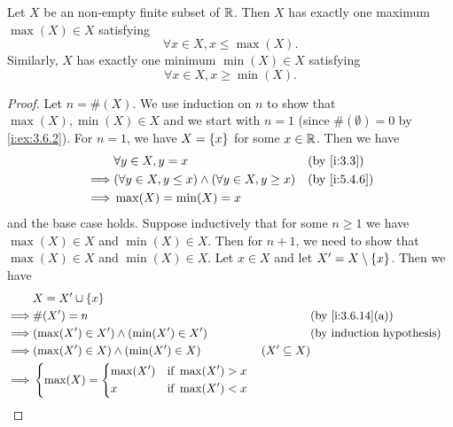 \begin{ac}\label{i:ac:5.4.1}
  Let \(X\) be an non-empty finite subset of \(\mathbb{R}\).
  Then \(X\) has exactly one maximum \(\max(X) \in X\) satisfying
  \[
    \forall x \in X, x \leq \max(X).
  \]
  Similarly, \(X\) has exactly one minimum \(\min(X) \in X\) satisfying
  \[
    \forall x \in X, x \geq \min(X).
  \]
\end{ac}

\begin{proof}
  Let \(n = \#(X)\).
  We use induction on \(n\) to show that \(\max(X), \min(X) \in X\) and we start with \(n = 1\) (since \(\#(\emptyset) = 0\) by \cref{i:ex:3.6.2}).
  For \(n = 1\), we have \(X = \left\lbrace x\right\rbrace\) for some \(x \in \mathbb{R}\).
  Then we have
  \begin{align*}
             & \forall y \in X, y = x                                        &  & \by{i:3.3}   \\
    \implies & (\forall y \in X, y \leq x) \land (\forall y \in X, y \geq x) &  & \by{i:5.4.6} \\
    \implies & \max(X) = \min(X) = x
  \end{align*}
  and the base case holds.
  Suppose inductively that for some \(n \geq 1\) we have \(\max(X) \in X\) and \(\min(X) \in X\).
  Then for \(n + 1\), we need to show that \(\max(X) \in X\) and \(\min(X) \in X\).
  Let \(x \in X\) and let \(X' = X \setminus \left\lbrace x\right\rbrace\).
  Then we have
  \begin{align*}
             & X = X' \cup \set{x}                                                                                                             \\
    \implies & \#(X') = n                                                                                &                  & \by{i:3.6.14}[a] \\
    \implies & (\max(X') \in X') \land (\min(X') \in X')                                                 &                  & \byIH            \\
    \implies & (\max(X') \in X) \land (\min(X') \in X)                                                   & (X' \subseteq X)                    \\
    \implies & \begin{dcases}
                 \max(X) = \begin{dcases}
                  \max(X') & \text{if } \max(X') > x \\
                  x        & \text{if } \max(X') < x
                \end{dcases} \\

\end{dcases}
\end{align*}
\end{proof}
